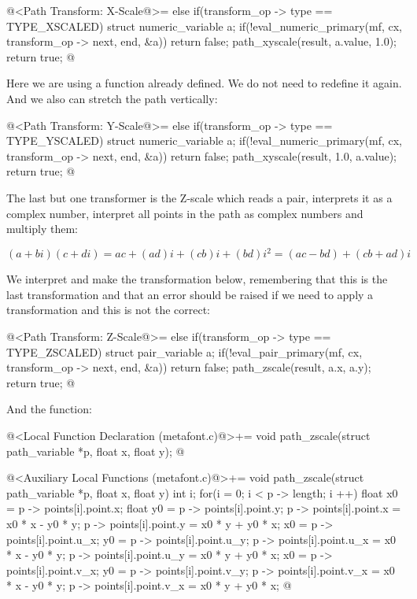 {{{{{\iniciocodigo
@<Path Transform: X-Scale@>=
else if(transform_op -> type == TYPE_XSCALED){
  struct numeric_variable a;
  if(!eval_numeric_primary(mf, cx, transform_op -> next, end, &a))
    return false;
  path_xyscale(result, a.value, 1.0);
  return true;
}
@
\fimcodigo

Here we are using a function already defined. We do not need to
redefine it again. And we also can stretch the path vertically:

\iniciocodigo
@<Path Transform: Y-Scale@>=
else if(transform_op -> type == TYPE_YSCALED){
  struct numeric_variable a;
  if(!eval_numeric_primary(mf, cx, transform_op -> next, end, &a))
    return false;
  path_xyscale(result, 1.0, a.value);  
  return true;
}
@
\fimcodigo

The last but one transformer is the Z-scale which reads a pair,
interprets it as a complex number, interpret all points in the path as
complex numbers and multiply them:

$$
(a+bi)(c+di) = ac + (ad)i + (cb)i + (bd)i^2 = (ac - bd) + (cb+ad)i
$$

We interpret and make the transformation below, remembering that this
is the last transformation and that an error should be raised if we
need to apply a transformation and this is not the correct:


\iniciocodigo
@<Path Transform: Z-Scale@>=
else if(transform_op -> type == TYPE_ZSCALED){
  struct pair_variable a;
  if(!eval_pair_primary(mf, cx, transform_op -> next, end, &a))
    return false;
  path_zscale(result, a.x, a.y);  
  return true;
}
@
\fimcodigo

And the function:

\iniciocodigo
@<Local Function Declaration (metafont.c)@>+=
void path_zscale(struct path_variable *p, float x, float y);
@
\fimcodigo

\iniciocodigo
@<Auxiliary Local Functions (metafont.c)@>+=
void path_zscale(struct path_variable *p, float x, float y){
  int i;
  for(i = 0; i < p -> length; i ++){
    float x0 = p -> points[i].point.x;
    float y0 = p -> points[i].point.y;
    p -> points[i].point.x = x0 * x - y0 * y;
    p -> points[i].point.y = x0 * y + y0 * x;
    x0 = p -> points[i].point.u_x;
    y0 = p -> points[i].point.u_y;
    p -> points[i].point.u_x = x0 * x - y0 * y;
    p -> points[i].point.u_y = x0 * y + y0 * x;
    x0 = p -> points[i].point.v_x;
    y0 = p -> points[i].point.v_y;
    p -> points[i].point.v_x = x0 * x - y0 * y;
    p -> points[i].point.v_x = x0 * y + y0 * x;
  }
}
@
\fimcodigo

}}}}}
